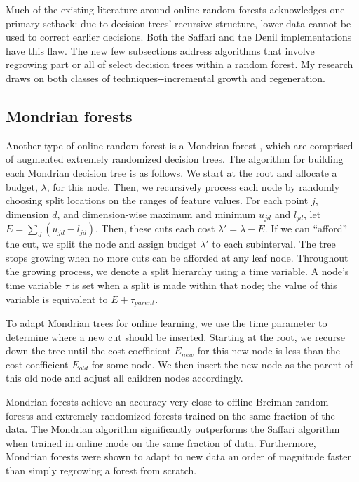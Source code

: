 Much of the existing literature around online random forests acknowledges one
primary setback: due to decision trees’ recursive structure, lower data cannot
be used to correct earlier decisions. Both the Saffari and the Denil
implementations have this flaw. The new few subsections address algorithms that
involve regrowing part or all of select decision trees within a random forest.
My research draws on both classes of techniques-{}-incremental growth and
regeneration.

\subsection{Mondrian forests}

Another type of online random forest is a Mondrian forest \cite{NIPS2014_5234},
which are comprised of augmented extremely randomized decision trees. The
algorithm for building each Mondrian decision tree is as follows.  We start at
the root and allocate a budget, $\lambda$, for this node. Then, we recursively
process each node by randomly choosing split locations on the ranges of feature
values. For each point $j$, dimension $d$, and dimension-wise maximum and
minimum $u_{jd}$ and $l_{jd}$, let $E = \sum_d(u_{jd}-l_{jd})$. Then, these
cuts each cost $\lambda' = \lambda - E$. If we can ``afford'' the cut, we split
the node and assign budget $\lambda'$ to each subinterval. The tree stops
growing when no more cuts can be afforded at any leaf node. Throughout the
growing process, we denote a split hierarchy using a time variable. A node's
time variable $\tau$ is set when a split is made within that node; the value of
this variable is equivalent to $E + \tau_{parent}$. 

To adapt Mondrian trees for online learning, we use the time parameter to
determine where a new cut should be inserted. Starting at the root, we recurse
down the tree until the cost coefficient $E_{new}$ for this new node is less
than the cost coefficient $E_{old}$ for some node. We then insert the new node
as the parent of this old node and adjust all children nodes accordingly.

Mondrian forests achieve an accuracy very close to offline Breiman random
forests and extremely randomized forests trained on the same fraction of the
data. The Mondrian algorithm significantly outperforms the Saffari algorithm
when trained in online mode on the same fraction of data. Furthermore, Mondrian
forests were shown to adapt to new data an order of magnitude faster than
simply regrowing a forest from scratch.

